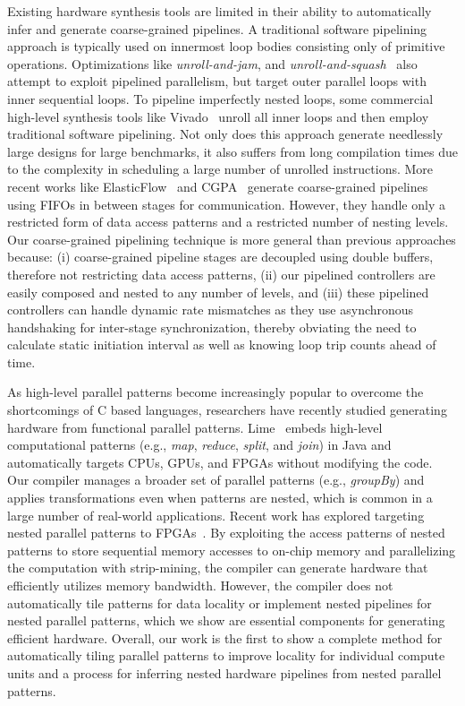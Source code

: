 Existing hardware synthesis tools are limited in their
ability to automatically infer and generate coarse-grained pipelines. A traditional
software pipelining approach is typically used on innermost loop bodies consisting
only of primitive operations. Optimizations like \emph{unroll-and-jam}, and \emph{unroll-and-squash}~\cite{unrollSquash}
also attempt to exploit pipelined parallelism, but target outer parallel loops
with inner sequential loops. To pipeline imperfectly nested loops, some
commercial high-level synthesis tools like Vivado~\cite{vivadohls} unroll all inner loops and then employ traditional
software pipelining. Not only does this approach generate needlessly large designs for large benchmarks,
it also suffers from long compilation times due to the complexity in scheduling a large number of unrolled instructions.
More recent works like ElasticFlow~\cite{elasticFlow} and CGPA~\cite{cgpa} generate coarse-grained
pipelines using FIFOs in between stages for communication. However, they handle only a restricted form of data access
patterns and a restricted number of nesting levels. Our coarse-grained pipelining technique is more general than previous approaches because:
(i) coarse-grained pipeline stages are decoupled using double buffers, therefore not restricting data access patterns, (ii) our pipelined controllers are easily composed and nested to any number of levels, and (iii) these pipelined controllers can handle
dynamic rate mismatches as they use asynchronous handshaking for inter-stage synchronization, thereby obviating the need
to calculate static initiation interval as well as knowing loop trip counts ahead of time.

As high-level parallel patterns become increasingly popular to overcome the
shortcomings of C based languages, researchers have recently studied generating
hardware from functional parallel patterns.  Lime~\cite{auerbach10lime}
embeds high-level computational patterns (e.g., \emph{map}, \emph{reduce}, \emph{split}, and \emph{join}) in
Java and automatically targets CPUs, GPUs, and FPGAs without modifying the
code.  Our compiler manages a broader set of parallel patterns (e.g., \emph{groupBy})
and applies transformations even when patterns are nested,
which is common in a large number of real-world applications.  Recent work has
explored targeting nested parallel patterns to
FPGAs~\cite{george14fpl}. By exploiting the access patterns of nested patterns
to store sequential memory accesses to on-chip memory and parallelizing the
computation with strip-mining, the compiler can generate hardware that
efficiently utilizes memory bandwidth.  However, the compiler does not
automatically tile patterns for data locality or implement nested pipelines
for nested parallel patterns, which we show are essential components for generating efficient hardware. Overall, our work is the first to show a complete method for
automatically tiling parallel patterns to improve locality for individual compute units and a process
for inferring nested hardware pipelines from nested parallel patterns.

